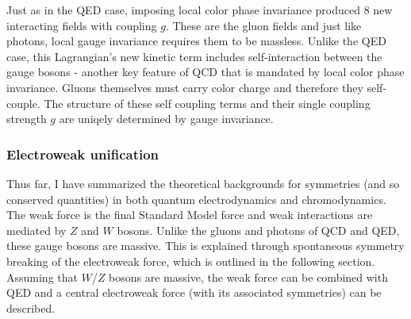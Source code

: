 Just as in the QED case, imposing local color phase invariance produced 8 new interacting fields with coupling $g$. These are the gluon fields and just like photons, local gauge invariance requires them to be massless. Unlike the QED case, this Lagrangian's new kinetic term includes self-interaction between the gauge bosons - another key feature of QCD that is mandated by local color phase invariance. Gluons themselves must carry color charge and therefore they self-couple. The structure of these self coupling terms and their single coupling strength $g$ are uniqely determined by gauge invariance. 

\subsubsection{Electroweak unification}
Thus far, I have summarized the theoretical backgrounds for symmetries (and so conserved quantities) in both quantum electrodynamics and chromodynamics. The weak force is the final Standard Model force and weak interactions are mediated by $Z$ and $W$ bosons. Unlike the gluons and photons of QCD and QED, these gauge bosons are massive. This is explained through spontaneous symmetry breaking of the electroweak force, which is outlined in the following section. Assuming that $W$/$Z$ bosons are massive, the weak force can be combined with QED and a central electroweak force (with its associated symmetries) can be described. 

